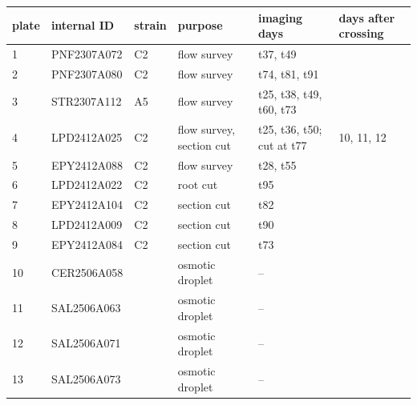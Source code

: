 \begin{center}
{\small
\begin{tabular}{llllll}
\hline
\textbf{plate} & \textbf{internal ID} & \textbf{strain} & \textbf{purpose} & \textbf{imaging days} & \textbf{days after crossing} \\
\hline
1 & PNF2307A072 & C2 & flow survey & t37, t49 & \todo{} \\
2 & PNF2307A080 & C2 & flow survey & t74, t81, t91 & \todo{} \\
3 & STR2307A112 & A5 & flow survey & t25, t38, t49, t60, t73 & \todo{} \\
4 & LPD2412A025 & C2 & flow survey, section cut & t25, t36, t50; cut at t77 & 10, 11, 12 \\
5 & EPY2412A088 & C2 & flow survey & t28, t55 & \todo{} \\
6 & LPD2412A022 & C2 & root cut & t95 & \todo{} \\
7 & EPY2412A104 & C2 & section cut & t82 & \todo{} \\
8 & LPD2412A009 & C2 & section cut & t90 & \todo{} \\
9 & EPY2412A084 & C2 & section cut & t73 & \todo{} \\
10 & CER2506A058 & \todo{} & osmotic droplet & -- & \todo{} \\
11 & SAL2506A063 & \todo{} & osmotic droplet & -- & \todo{} \\
12 & SAL2506A071 & \todo{} & osmotic droplet & -- & \todo{} \\
13 & SAL2506A073 & \todo{} & osmotic droplet & -- & \todo{} \\
\hline
\end{tabular}
}
\end{center}
